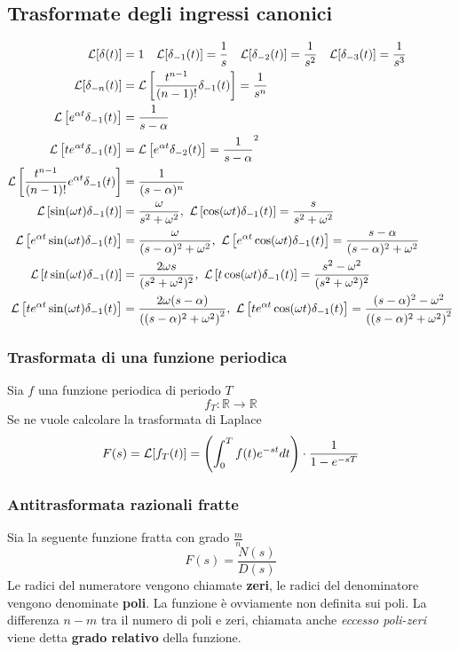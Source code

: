 \subsection{Trasformate degli ingressi canonici}
$$\begin{aligned}
\mathcal{L}[\delta(t)] &= 1 \quad
\mathcal{L}[\delta_{-1}(t)] = \frac{1}{s}\quad
\mathcal{L}[\delta_{-2}(t)] = \frac{1}{s^2}\quad
\mathcal{L}[\delta_{-3}(t)] = \frac{1}{s^3} \\
\mathcal{L}[\delta_{-n}(t)] &= \mathcal{L}\left[\frac{t^{n-1}}{(n-1)!}\delta_{-1}(t)\right] =
\frac{1}{s^n}\\
\mathcal{L}\left[e^{\alpha t}\delta_{-1}(t)\right] &= \frac{1}{s-\alpha}\\
\mathcal{L}\left[te^{\alpha t}\delta_{-1}(t)\right] &=
\mathcal{L} \left[e^{\alpha t}\delta_{-2}(t)\right] =
\frac{1}{s-\alpha}^2\\
\mathcal{L}\left[\frac{t^{n-1}}{(n-1)!}e^{\alpha t} \delta_{-1}(t)\right] &=
\frac{1}{(s-\alpha)^n} \\
\mathcal{L}\left[\sin(\omega t)\delta_{-1}(t)\right] &= \frac{\omega}{s^2+\omega^2},\
\mathcal{L}\left[\cos(\omega t)\delta_{-1}(t)\right] = \frac{s}{s^2+\omega^2}\\
\mathcal{L}\left[e^{\alpha t}\sin(\omega t) \delta_{-1}(t)\right] &=
\frac{\omega}{(s-\alpha)^2+\omega^2},\ \mathcal{L}\left[e^{\alpha t}\cos(\omega
t)\delta_{-1}(t)\right] = \frac{s-\alpha}{(s-\alpha)^2+\omega^2}\\
\mathcal{L}\left[t\sin(\omega t)\delta_{-1}(t)\right] & = \frac{2\omega
s}{(s^2+\omega^2)^2},\  \mathcal{L}\left[t\cos(\omega t)\delta_{-1}(t)\right] =
\frac{s^2-\omega^2}{(s^2+\omega^2)^2}\\
\mathcal{L}\left[te^{\alpha t}\sin(\omega t) \delta_{-1}(t)\right] & =
\frac{2\omega(s-\alpha)}{\left((s-\alpha)^2+\omega^2\right)^2},\
\mathcal{L}\left[te^{\alpha t}\cos(\omega t) \delta_{-1}(t)\right] =
\frac{(s-\alpha)^2-\omega^2}{\left((s-\alpha)^2+\omega^2\right)^2}
\end{aligned}
$$

\subsubsection{Trasformata di una funzione periodica}
Sia $f$ una funzione periodica di periodo $T$
$$
f_T: \mathbb{R}\to\mathbb{R}
$$
Se ne vuole calcolare la trasformata di Laplace
$$
F(s) = \mathcal{L}[f_T(t)] = \left(\int_0^Tf(t)e^{-st}dt\right)\cdot\frac{1}{1-e^{-sT}}
$$

\newpage
\subsubsection{Antitrasformata razionali fratte}
Sia la seguente funzione fratta con grado $\frac{m}{n}$
$$
F(s) = \frac{N(s)}{D(s)}
$$
Le radici del numeratore vengono chiamate \textbf{zeri}, le radici del
denominatore vengono denominate \textbf{poli}. La funzione è ovviamente non
definita sui poli.
La differenza $n-m$ tra il numero di poli e zeri, chiamata anche \textit{eccesso
poli-zeri} viene detta \textbf{grado relativo} della funzione.

